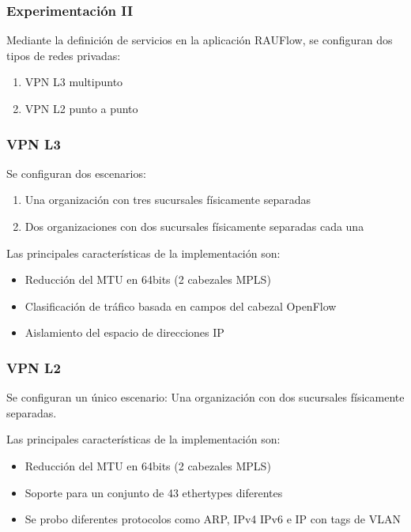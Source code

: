 \documentclass{beamer}
\begin{document}
\begin{frame}
\frametitle{Experimentaci\'on II} 

Mediante la definici\'on de servicios en la aplicaci\'on RAUFlow, se configuran dos tipos de redes privadas:
\begin{enumerate}
\item VPN L3 multipunto
\item VPN L2 punto a punto 
\end{enumerate}


\end{frame}

\begin{frame}
\frametitle{VPN L3} 

Se configuran dos escenarios:

\begin{enumerate}
\item Una organizaci\'on con tres sucursales f\'isicamente separadas
\item Dos organizaciones con dos sucursales f\'isicamente separadas cada una
\end{enumerate}

\vspace{0.4cm}

Las principales características de la implementaci\'on son:
\begin{itemize}
\item Reducci\'on del MTU en 64bits (2 cabezales MPLS)
\item Clasificaci\'on de tr\'afico basada en campos del cabezal OpenFlow
\item Aislamiento del espacio de direcciones IP
\end{itemize}


\end{frame}

\begin{frame}
\frametitle{VPN L2} 

Se configuran un \'unico escenario: Una organizaci\'on con dos sucursales f\'isicamente separadas.

\vspace{0.4cm}

Las principales características de la implementaci\'on son:
\begin{itemize}
\item Reducci\'on del MTU en 64bits (2 cabezales MPLS)
\item Soporte para un conjunto de 43 ethertypes diferentes
\item Se probo diferentes protocolos como ARP, IPv4 IPv6 e IP con tags de VLAN
\end{itemize}


\end{frame}
\end{document}
